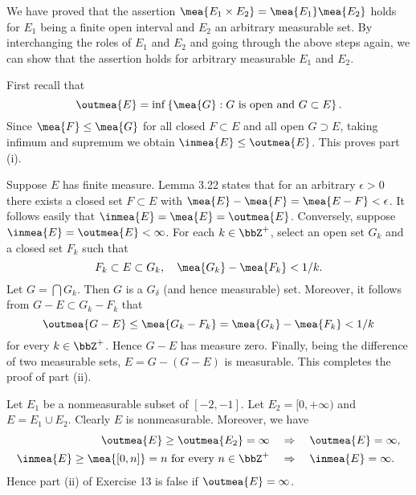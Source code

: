 \begin{exercise}{3.12}
  We have proved that the assertion $\mea{E_1 \times E_2} = \mea{E_1} \mea{E_2}$
  holds for $E_1$ being a finite open interval and $E_2$ an arbitrary measurable set.
  By interchanging the roles of $E_1$ and $E_2$
  and going through the above steps again,
  we can show that the assertion holds for arbitrary measurable $E_1$ and $E_2$.
\end{exercise}

\begin{exercise}{3.13}
  First recall that
  \[
    \outmea{E} = \inf \left\{ \mea{G} : G \text{ is open and } G \subset E\right\}.
  \]
  Since $\mea{F} \le \mea{G}$ for all closed $F \subset E$
  and all open $G \supset E$,
  taking infimum and supremum we obtain
  $\inmea{E} \le \outmea{E}$.
  This proves part (i).

  Suppose $E$ has finite measure.
  Lemma 3.22 states that for an arbitrary $\epsilon > 0$
  there exists a closed set $F \subset E$ with
  $\mea{E} - \mea{F} = \mea{E-F} < \epsilon$.
  It follows easily that $\inmea{E} = \mea{E} = \outmea{E}$.
  Conversely, suppose $\inmea{E} = \outmea{E} < \infty$.
  For each $k \in \bbZ^+$,
  select an open set $G_k$ and a closed set $F_k$ such that
  \[
    F_k \subset E \subset G_k, \quad \mea{G_k} - \mea{F_k} < 1/k.
  \]
  Let $G = \bigcap G_k$.
  Then $G$ is a $G_\delta$ (and hence measurable) set.
  Moreover, it follows from $G - E \subset G_k - F_k$ that
  \[
    \outmea{G-E} \le \mea{G_k - F_k} = \mea{G_k} - \mea{F_k} < 1/k
  \]
  for every $k \in \bbZ^+$.
  Hence $G-E$ has measure zero.
  Finally, being the difference of two measurable sets,
  $E = G - (G-E)$ is measurable.
  This completes the proof of part (ii).
\end{exercise}

\begin{exercise}{3.14}
  Let $E_1$ be a nonmeasurable subset of $[-2, -1]$.
  Let $E_2 = [0, +\infty)$ and $E = E_1 \cup E_2$.
  Clearly $E$ is nonmeasurable.
  Moreover, we have
  \[
    \begin{aligned}
      \outmea{E} \ge \outmea{E_2} = \infty \quad &\Rightarrow \quad \outmea{E} = \infty, \\
      \inmea{E} \ge \mea{[0, n]} = n \text{ for every } n \in \bbZ^+
      \quad &\Rightarrow \quad \inmea{E} = \infty.
    \end{aligned}
  \]
  Hence part (ii) of Exercise 13 is false if $\outmea{E} = \infty$.
\end{exercise}

